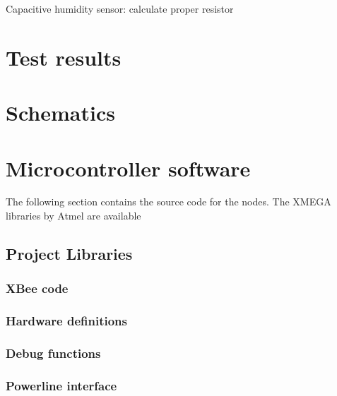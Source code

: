 Capacitive humidity sensor: calculate proper resistor


\section{Test results}

\appendix

\section{Schematics}

\section{Microcontroller software}
The following section contains the source code for the nodes. The XMEGA
libraries by Atmel are available %



\subsection{Project Libraries}
\label{an:project-libs}

\subsubsection{XBee code}



\subsubsection{Hardware definitions}


\subsubsection{Debug functions}



\subsubsection{Powerline interface}



